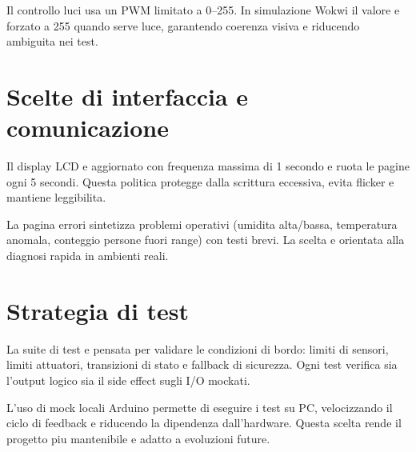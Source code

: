 Il controllo luci usa un PWM limitato a 0--255. In simulazione Wokwi il valore e forzato a 255 quando serve luce, garantendo coerenza visiva e riducendo ambiguita nei test.

\section{Scelte di interfaccia e comunicazione}
Il display LCD e aggiornato con frequenza massima di 1 secondo e ruota le pagine ogni 5 secondi. Questa politica protegge dalla scrittura eccessiva, evita flicker e mantiene leggibilita.

La pagina errori sintetizza problemi operativi (umidita alta/bassa, temperatura anomala, conteggio persone fuori range) con testi brevi. La scelta e orientata alla diagnosi rapida in ambienti reali.

\section{Strategia di test}
La suite di test e pensata per validare le condizioni di bordo: limiti di sensori, limiti attuatori, transizioni di stato e fallback di sicurezza. Ogni test verifica sia l'output logico sia il side effect sugli I/O mockati.

L'uso di mock locali Arduino permette di eseguire i test su PC, velocizzando il ciclo di feedback e riducendo la dipendenza dall'hardware. Questa scelta rende il progetto piu mantenibile e adatto a evoluzioni future.
